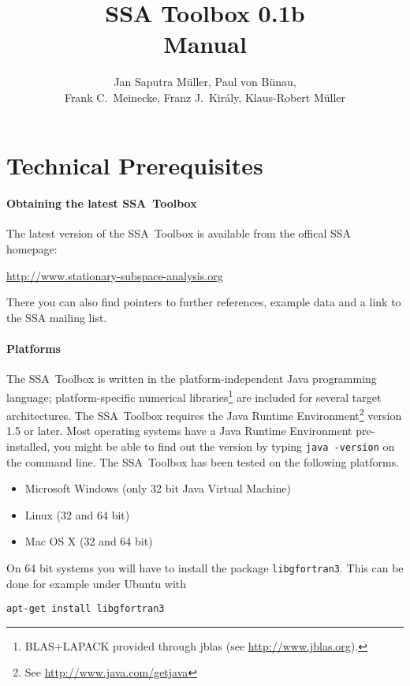 \documentclass{article}
\newcommand{\1}{\ensuremath{\mathds{1}}}
\newcommand{\0}{\ensuremath{0}}
\begin{document}
\title{SSA Toolbox 0.1b \\ Manual}
\author{Jan Saputra M\"uller, Paul von B\"unau, \\ Frank C.~Meinecke, Franz J.~Kir\'{a}ly, Klaus-Robert M\"uller}

\maketitle

\tableofcontents

\newpage

\section{Technical Prerequisites}

\paragraph{Obtaining the latest SSA~Toolbox}

The latest version of the SSA~Toolbox is available from the offical SSA homepage: 
\begin{center}
	\url{http://www.stationary-subspace-analysis.org}
\end{center}
There you can also find pointers to further references, example data and a link 
to the SSA mailing list. 

\paragraph{Platforms}

The SSA~Toolbox is written in the platform-independent Java programming language; 
platform-specific numerical libraries\footnote{BLAS+LAPACK provided through
jblas (see \url{http://www.jblas.org}).} are included for several target architectures. 
The SSA~Toolbox requires the Java Runtime Environment\footnote{See 
\url{http://www.java.com/getjava}} version 1.5 or later. Most operating systems
have a Java Runtime Environment pre-installed, you might be able to find out 
the version by typing \texttt{java -version} on the command line. The SSA~Toolbox has 
been tested on the following platforms.
\begin{itemize}
	\item Microsoft Windows (only 32 bit Java Virtual Machine)
	\item Linux (32 and 64 bit)
	\item Mac OS X (32 and 64 bit)
\end{itemize}
On 64 bit systems you will have to install the package \texttt{libgfortran3}. This can be
done for example under Ubuntu with
\begin{center}
	\texttt{apt-get install libgfortran3}
\end{center}
\end{document}
